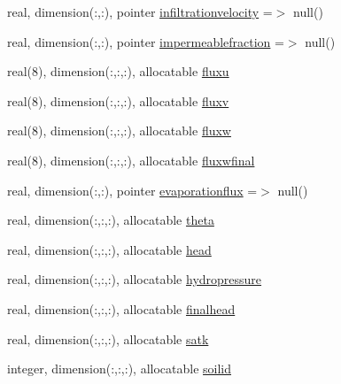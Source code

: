 \begin{DoxyCompactItemize}
\item 
real, dimension(\+:,\+:), pointer \mbox{\hyperlink{structmoduleporousmedia_1_1t__porousmedia_a2d1ad84e010693fc2e3e58b13dbb9f09}{infiltrationvelocity}} =$>$ null()
\item 
real, dimension(\+:,\+:), pointer \mbox{\hyperlink{structmoduleporousmedia_1_1t__porousmedia_a3a9fd530afa636727b2b8dba51915858}{impermeablefraction}} =$>$ null()
\item 
real(8), dimension(\+:,\+:,\+:), allocatable \mbox{\hyperlink{structmoduleporousmedia_1_1t__porousmedia_a3a1eb8988f7d9765ccd0a8420929a7b8}{fluxu}}
\item 
real(8), dimension(\+:,\+:,\+:), allocatable \mbox{\hyperlink{structmoduleporousmedia_1_1t__porousmedia_ad866e74725fb54acd39915099088a152}{fluxv}}
\item 
real(8), dimension(\+:,\+:,\+:), allocatable \mbox{\hyperlink{structmoduleporousmedia_1_1t__porousmedia_af0f6ff784fad0a5a255a94486d8dfb00}{fluxw}}
\item 
real(8), dimension(\+:,\+:,\+:), allocatable \mbox{\hyperlink{structmoduleporousmedia_1_1t__porousmedia_a55096780e1eeb292707490c061fcd7c4}{fluxwfinal}}
\item 
real, dimension(\+:,\+:), pointer \mbox{\hyperlink{structmoduleporousmedia_1_1t__porousmedia_af2db6666919b79db41731577d6a8da77}{evaporationflux}} =$>$ null()
\item 
real, dimension(\+:,\+:,\+:), allocatable \mbox{\hyperlink{structmoduleporousmedia_1_1t__porousmedia_a0131bb0182d4048cfe19e50325e3d677}{theta}}
\item 
real, dimension(\+:,\+:,\+:), allocatable \mbox{\hyperlink{structmoduleporousmedia_1_1t__porousmedia_aa4a0901e35cbd559459d440c2c4b1875}{head}}
\item 
real, dimension(\+:,\+:,\+:), allocatable \mbox{\hyperlink{structmoduleporousmedia_1_1t__porousmedia_acf788ef6600bc18a381f7cace855ca0e}{hydropressure}}
\item 
real, dimension(\+:,\+:,\+:), allocatable \mbox{\hyperlink{structmoduleporousmedia_1_1t__porousmedia_a16794b2248d4152283099a83d64b4cdd}{finalhead}}
\item 
real, dimension(\+:,\+:,\+:), allocatable \mbox{\hyperlink{structmoduleporousmedia_1_1t__porousmedia_ae9b20b88c862f23b453637a7f5b6f7c5}{satk}}
\item 
integer, dimension(\+:,\+:,\+:), allocatable \mbox{\hyperlink{structmoduleporousmedia_1_1t__porousmedia_a6972c827bbb9a3df9a39dd92f27313af}{soilid}}
\item 

\end{DoxyCompactItemize}
